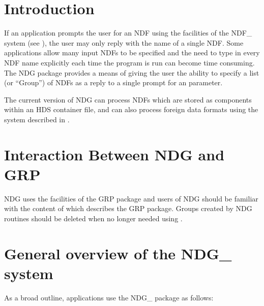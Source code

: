 \documentclass[twoside,11pt,nolof]{starlink}
\begin{document}
\scfrontmatter

\section {Introduction}

If an application prompts the user for an NDF using the facilities of the NDF\_
system (see ), the user may only reply with the name of a single NDF. Some
applications allow many input NDFs to be specified and the need to
type in every NDF name explicitly each time the program is run can become time
consuming. The NDG package provides a means of giving the user the
ability to specify a list (or ``Group'') of NDFs as a reply to a single prompt
for an parameter.

The current version of NDG can process NDFs which are stored as
components within an HDS container file, and can also process foreign
data formats using the system described in .


\section {Interaction Between NDG and GRP}
NDG uses the facilities of the GRP package and users of NDG should be familiar
with the content of  which describes the GRP package. Groups
created by NDG routines should be deleted when no longer needed using
.

\section {General overview of the NDG\_ system}
As a broad outline, applications use the NDG\_ package as follows:
\end{document}
